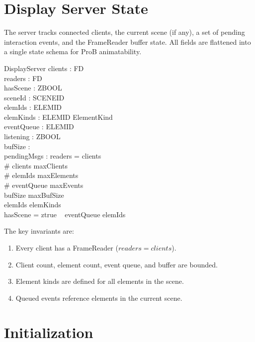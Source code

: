 \documentclass[a4paper,10pt,fleqn]{article}
\begin{document}
\section{Display Server State}

The server tracks connected clients, the current scene (if any),
a set of pending interaction events, and the FrameReader buffer
state.  All fields are flattened into a single state schema for
ProB animatability.

\begin{schema}{DisplayServer}
  clients : \power FD \\
  readers : \power FD \\
  hasScene : ZBOOL \\
  sceneId : SCENEID \\
  elemIds : \power ELEMID \\
  elemKinds : ELEMID \pfun ElementKind \\
  eventQueue : \power ELEMID \\
  listening : ZBOOL \\
  bufSize : \nat \\
  pendingMsgs : \nat
  \where
  readers = clients \\
  \# clients \leq maxClients \\
  \# elemIds \leq maxElements \\
  \# eventQueue \leq maxEvents \\
  bufSize \leq maxBufSize \\
  elemIds \subseteq \dom elemKinds \\
  hasScene = ztrue \implies
\quad~ eventQueue \subseteq elemIds
\end{schema}

The key invariants are:
\begin{enumerate}
  \item Every client has a FrameReader ($readers = clients$).
  \item Client count, element count, event queue, and buffer are bounded.
  \item Element kinds are defined for all elements in the scene.
  \item Queued events reference elements in the current scene.
\end{enumerate}

\section{Initialization}
\end{document}
